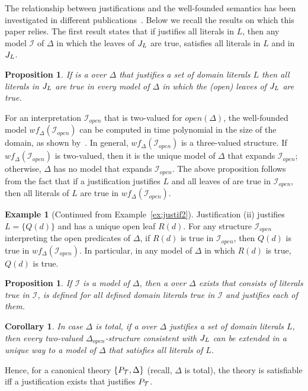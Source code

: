 \documentclass[11pt]{article}
\newcommand{\m}[1]{\ensuremath{#1}\xspace}
\newcommand{\I}{\m{\mathcal{I}}}
\newcommand{\theory}{\m{\mathcal{T}}}
\newcommand{\D}{\m{\Delta}}
\newcommand{\open}[1]{\m{#1_{open}}}
\theoremstyle{plain}
\newtheorem{corollary}[thm]{Corollary}
\newtheorem{proposition}[thm]{Proposition}
\theoremstyle{definition}
\theoremstyle{example_basic}
\newtheorem{example}[thm]{Example}
\theoremstyle{example_contd}
\theoremstyle{plain}
\newcommand{\pt}{\ensuremath{P_\text{\theory}}\xspace}
\newcommand{\change}[1]{#1}
\begin{document}
The relationship between justifications and the well-founded semantics has been investigated in different publications~\cite{DeneckerS93,Denecker92e,phd/Marien09}. Below we recall the results on which this paper relies. The first result states that if \jgraph justifies all literals in $L$, then any model $\I$ of $\D$ in which the leaves of $J_L$ are true, satisfies all literals in $L$ and in $J_L$.  

\begin{proposition}\label{prop:just}
If \jgraph is a \justification over \D that justifies a set of domain literals $L$ then all literals in  $J_L$ are true in every model of $\D$ in which the (open) leaves of $J_L$ are true. 
\end{proposition}

For an interpretation $\I_{open}$ that is two-valued for $open(\D)$, the well-founded model $wf_{\D}(\I_{open})$ can be computed in time polynomial in the size of the domain, as shown by~. In general, $wf_{\D}(\I_{open})$ is a three-valued structure. If  $wf_{\D}(\I_{open})$ is two-valued, then it is the unique model of $\D$ that expands $\I_{open}$; otherwise, \D has no model that expands $\I_{open}$. The above proposition follows from the fact that if a justification \jgraph justifies $L$ and all leaves of \jgraph are true in $\I_{open}$, then all literals of $L$ are true in $wf_{\D}(\I_{open})$.

\begin{example}[Continued from Example~\ref{ex:justif2}]
\change{Justification (ii) justifies $L=\{Q(d)\}$ and has a unique open leaf $R(d)$. For any structure $\I_{open}$ interpreting the open predicates of $\D$, if $R(d)$ is true in $\I_{open}$, then $Q(d)$ is true in $wf_{\D}(\I_{open})$. In particular, in any model of \D in which $R(d)$ is true, $Q(d)$ is true.}
\end{example}

\begin{proposition}\label{prop:justbis}
\change{If $\I$ is a model of \D, then a \justification \jgraph over \D exists that consists of literals true in \I, is defined for all defined domain literals true in $\I$ and justifies each of them.}
\end{proposition}

\begin{corollary}\label{cor:voila}
In case \D is total, if a \justification \jgraph over \D justifies a set of domain literals $L$, then every two-valued \open{\D}-structure consistent with $J_L$ can be extended in a unique way to a model of \D that satisfies all literals of $L$. 
\end{corollary}
Hence, for a canonical theory $\{\pt, \D\}$ (recall, \D is total), the theory is satisfiable iff a justification \jgraph exists that justifies \pt. 
\end{document}
